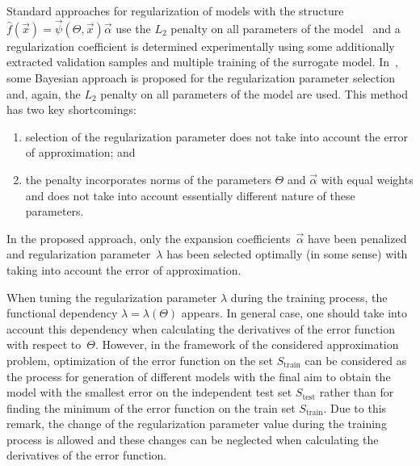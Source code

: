\begin{multicols}{2}
\noindent
Standard approaches for regularization of models with the structure
 $\hat f \left( {\vec x} \right) = {\vec \psi} \left( {\Theta}, {\vec x} \right) 
 {\vec \alpha}$ use the 
  $L_2$ penalty on all parameters of the model~\cite{elementsOfStatLearning} and 
  a regularization coefficient is determined experimentally using some additionally 
  extracted validation samples and multiple training of the surrogate model.
In~\cite{bayesianLearning}, some Bayesian approach is proposed for the regularization 
parameter selection and, again, the $L_2$ penalty on all parameters of the model are used.
This method has two key shortcomings: 
\begin{enumerate}[(1)]
\item selection of the regularization parameter does 
not take into account the error of approximation; and\\[-9pt]
\item  the penalty incorporates norms of 
the parameters $\Theta$ and $\vec\alpha$ with equal weights and does not take into 
account essentially different nature of these parameters.
\end{enumerate}

In the proposed approach,  only the expansion coefficients~$\vec \alpha$  have been penalized
and regularization parameter~$\lambda$ has been selected optimally (in some sense) with 
taking into account the error of approximation.
{ %

}

When tuning the regularization parameter $\lambda$ during the training process, 
the functional dependency  $\lambda = \lambda \left( \Theta \right)$ appears. In general 
case, one should take into account this dependency when calculating the derivatives 
of the error function with respect to~$\Theta$.
However, in the framework of the considered approximation problem, optimization of 
the error function on the set $S_{\mathrm{train}}$ can be considered as the process for 
generation of different models with the final aim to obtain the model with the smallest 
error on the independent test set $S_{\mathrm{test}}$ rather than for finding the minimum of the 
error function on the train set $S_{\mathrm{train}}$.
Due to this remark, the change of the regularization parameter value during the training process 
is allowed and  these changes can be neglected
when calculating the derivatives of the error  function.
{

}

\begin{figure*}[b] %
\vspace*{6pt}
 \begin{center}
 \mbox{%
 \epsfxsize=162.923mm
 }
 \end{center}
 \vspace*{-6pt}
  \label{boxplot_train}
\end{figure*}


\end{multicols}
